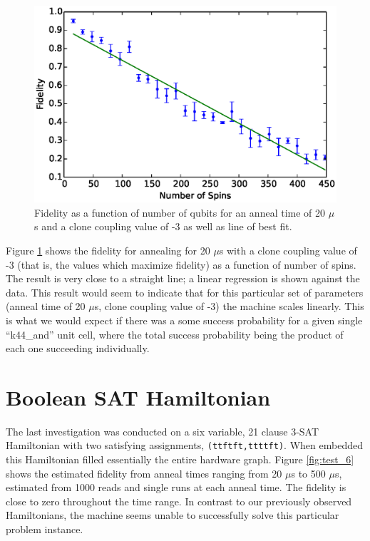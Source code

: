 \begin{figure}
	\includegraphics{img/trend.eps}
	\caption[Fidelity vs Number of Qubits]{Fidelity as a function of number of qubits for an anneal time of 20 $\mu$s and a clone coupling value of -3 as well as line of best fit.}
	\label{fig:trend}
\end{figure}

Figure \ref{fig:trend} shows the fidelity for annealing for 20 $\mu$s with a clone coupling value of -3 (that is, the values which maximize fidelity) as a function of number of spins.  The result is very close to a straight line; a linear regression is shown against the data.  This result would seem to indicate that for this particular set of parameters (anneal time of 20 $\mu$s, clone coupling value of -3) the \machine machine scales linearly.  This is what we would expect if there was a some success probability for a given single ``k44\_and'' unit cell, where the total success probability being the product of each one succeeding individually.

\section{Boolean SAT Hamiltonian}
The last investigation was conducted on a six variable, 21 clause 3-SAT Hamiltonian with two satisfying assignments, \texttt{(ttftft,ttttft)}.  When embedded this Hamiltonian filled essentially the entire hardware graph.  Figure \ref{fig:test_6} shows the estimated fidelity from anneal times ranging from 20 $\mu$s to 500 $\mu$s, estimated from 1000 reads and single runs at each anneal time.  The fidelity is close to zero throughout the time range.  In contrast to our previously observed Hamiltonians, the \machine machine seems unable to successfully solve this particular problem instance.

